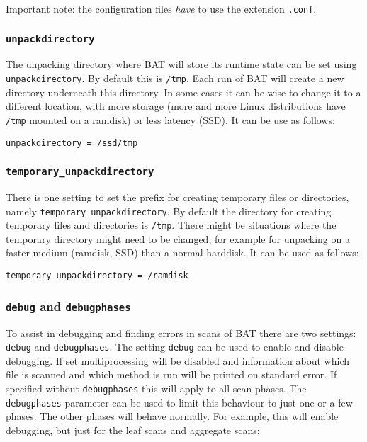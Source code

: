 \documentclass[10pt,a4paper]{article}
\begin{document}
Important note: the configuration files \textit{have} to use the extension
\texttt{.conf}.

\subsubsection{\texttt{unpackdirectory}}

The unpacking directory where BAT will store its runtime state can be set using
\texttt{unpackdirectory}. By default this is \texttt{/tmp}. Each run of BAT
will create a new directory underneath this directory. In some cases it can be
wise to change it to a different location, with more storage (more and more
Linux distributions have \texttt{/tmp} mounted on a ramdisk) or less latency
(SSD). It can be use as follows:

\begin{verbatim}
unpackdirectory = /ssd/tmp
\end{verbatim}

\subsubsection{\texttt{temporary\_unpackdirectory}}

There is one setting to set the prefix for creating temporary files or
directories, namely \texttt{temporary\_unpackdirectory}. By default the
directory for creating temporary files and directories is \texttt{/tmp}. There
might be situations where the temporary directory might need to be changed, for
example for unpacking on a faster medium (ramdisk, SSD) than a normal harddisk.
It can be used as follows:

\begin{verbatim}
temporary_unpackdirectory = /ramdisk
\end{verbatim}

\subsubsection{\texttt{debug} and \texttt{debugphases}}

To assist in debugging and finding errors in scans of BAT there are two
settings: \texttt{debug} and \texttt{debugphases}. The setting \texttt{debug}
can be used to enable and disable debugging. If set multiprocessing will be
disabled and information about which file is scanned and which method is run
will be printed on standard error. If specified without \texttt{debugphases}
this will apply to all scan phases. The \texttt{debugphases} parameter can be
used to limit this behaviour to just one or a few phases. The other phases will
behave normally. For example, this will enable debugging, but just for the
leaf scans and aggregate scans:
\end{document}
